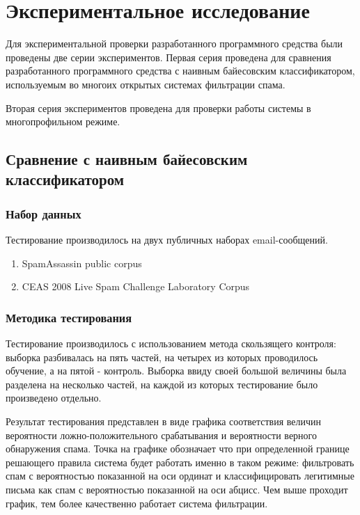 \section{Экспериментальное исследование}

Для экспериментальной проверки разработанного программного средства были проведены две серии экспериментов. Первая серия проведена для сравнения разработанного программного средства с наивным байесовским классификатором, используемым во многоих открытых системах фильтрации спама.

Вторая серия экспериментов проведена для проверки работы системы в многопрофильном режиме.

\subsection{Сравнение с наивным байесовским классификатором}

\subsubsection {Набор данных}

Тестирование производилось на двух публичных наборах email-сообщений.

\begin{enumerate}
	\item SpamAssassin public corpus \cite{SAPC}
	\item CEAS 2008 Live Spam Challenge Laboratory Corpus \cite{CEAS}
\end{enumerate}

\subsubsection{Методика тестирования}

Тестирование производилось с использованием метода скользящего контроля: выборка разбивалась на пять частей, на четырех из которых проводилось обучение, а на пятой - контроль. Выборка \cite{CEAS} ввиду своей большой величины была разделена на несколько частей, на каждой из которых тестирование было произведено отдельно. 

Результат тестирования представлен в виде графика соответствия величин вероятности ложно-положительного срабатывания и вероятности верного обнаружения спама. Точка на графике обозначает что при определенной границе решающего правила система будет работать именно в таком режиме: фильтровать спам с вероятностью показанной на оси ординат и классифицировать легитимные письма как спам с вероятностью показанной на оси абцисс. Чем выше проходит график, тем более качественно работает система фильтрации.

